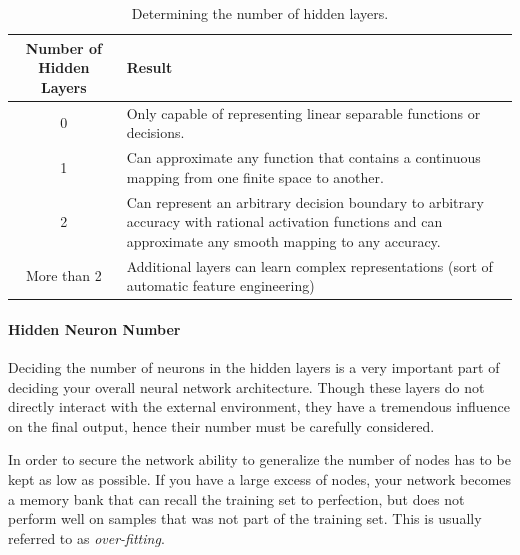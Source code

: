 \begin{center}
\begin{table}[htbp]
\begin{tabularx}{\textwidth}{|c|X|}%
\hline
Number of Hidden Layers & Result\xdef\tempwidth{\the\linewidth}\\
\hline
0 & \multicolumn{1}{|m{\tempwidth}|}{Only capable of representing linear separable functions or decisions.} \\
\hline
1 & \multicolumn{1}{|m{\tempwidth}|}{Can approximate any function that contains a continuous mapping from one finite space to another.} \\
\hline
2 & \multicolumn{1}{|m{\tempwidth}|}{Can represent an arbitrary decision boundary to arbitrary accuracy with rational activation functions and can approximate any smooth mapping to any accuracy.} \\
\hline
More than 2 &  \multicolumn{1}{|m{\tempwidth}|}{Additional layers can learn complex representations (sort of automatic feature engineering)} \\
\hline
\end{tabularx}
\vspace{2mm}
\caption{Determining the number of hidden layers.}
\label{tab:nn}
\end{table}
\end{center}

\paragraph{Hidden Neuron Number}

Deciding the number of neurons in the hidden layers is a very important part of deciding your overall neural network architecture. Though these layers do not directly interact with the external environment, they have a tremendous influence on the final output, hence their number must be carefully considered.

In order to secure the network ability to generalize the number of nodes has to be kept as low as possible. If you have a large excess of nodes, your network becomes a memory bank that can recall the training set to perfection, but does not perform well on samples that was not part of the training set. This is usually referred to as \emph{over-fitting}.


